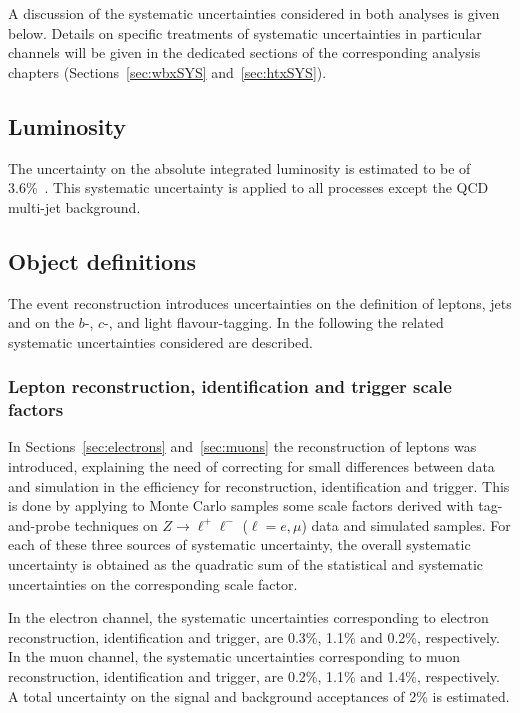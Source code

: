 A discussion of the  systematic uncertainties considered in
both analyses is given below.
Details on specific treatments of systematic uncertainties in particular channels will
be given in the dedicated sections of the corresponding analysis chapters 
(Sections~\ref{sec:wbxSYS} and~\ref{sec:htxSYS}).



\subsection{Luminosity}
\label{sec:syst_lumi}
The uncertainty on the absolute integrated luminosity is estimated to be
of 3.6\%~\cite{lumi}. This systematic uncertainty
is applied to all processes except the QCD multi-jet background.

\subsection{Object definitions}
\label{sec:syst_objects}
The event reconstruction introduces uncertainties on the definition of
leptons, jets and on the $b$-, $c$-, and light flavour-tagging. In the
following the related systematic uncertainties considered are described.

\subsubsection{Lepton reconstruction, identification and trigger scale factors}
\label{sec:syst_lepID}

In Sections~\ref{sec:electrons} and~\ref{sec:muons} the reconstruction
of leptons was introduced, explaining the need of correcting for small
differences between data and simulation in the efficiency for
reconstruction, identification and trigger. This is done by
applying to Monte Carlo samples some scale factors derived 
with tag-and-probe techniques 
on $Z\to \ell^+\ell^-$ ($\ell=e,\mu$) data and simulated samples.
For each of these three sources of systematic uncertainty, 
the overall systematic uncertainty is obtained 
as the quadratic sum of the statistical
and systematic uncertainties on the corresponding scale factor.

In the electron channel, the systematic uncertainties corresponding to
electron reconstruction, identification and trigger, are 0.3\%, 1.1\% 
and 0.2\%, respectively.
In the muon channel, the systematic uncertainties corresponding to
muon reconstruction, identification and trigger, are 0.2\%, 1.1\% and 1.4\%, 
respectively.
A total uncertainty on the signal and background acceptances of 2\% is estimated.


